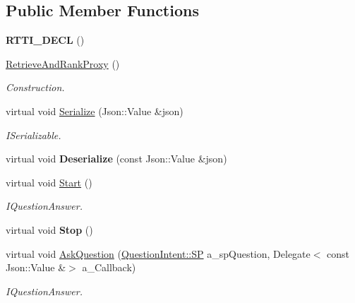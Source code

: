\subsection*{Public Member Functions}
\begin{DoxyCompactItemize}
\item 
\mbox{\label{class_retrieve_and_rank_proxy_a3c6e8d100b9f93ddfe543be4f9f2772f}} 
{\bfseries R\+T\+T\+I\+\_\+\+D\+E\+CL} ()
\item 
\mbox{\label{class_retrieve_and_rank_proxy_afcf015e04a0e2d4aba8ea0961e1d1609}} 
\hyperlink{class_retrieve_and_rank_proxy_afcf015e04a0e2d4aba8ea0961e1d1609}{Retrieve\+And\+Rank\+Proxy} ()
\begin{DoxyCompactList}\small\item\em Construction. \end{DoxyCompactList}\item 
\mbox{\label{class_retrieve_and_rank_proxy_ad6f13040c5fb81646667bc38d3d300a4}} 
virtual void \hyperlink{class_retrieve_and_rank_proxy_ad6f13040c5fb81646667bc38d3d300a4}{Serialize} (Json\+::\+Value \&json)
\begin{DoxyCompactList}\small\item\em I\+Serializable. \end{DoxyCompactList}\item 
\mbox{\label{class_retrieve_and_rank_proxy_a06c151d37ff30b6cc45df3b99fb449fb}} 
virtual void {\bfseries Deserialize} (const Json\+::\+Value \&json)
\item 
\mbox{\label{class_retrieve_and_rank_proxy_ab3575f2520ab94b298dc4875d468de24}} 
virtual void \hyperlink{class_retrieve_and_rank_proxy_ab3575f2520ab94b298dc4875d468de24}{Start} ()
\begin{DoxyCompactList}\small\item\em I\+Question\+Answer. \end{DoxyCompactList}\item 
\mbox{\label{class_retrieve_and_rank_proxy_ab2f63688623ccd8b424b677671f7f3bc}} 
virtual void {\bfseries Stop} ()
\item 
\mbox{\label{class_retrieve_and_rank_proxy_a8393f23b59a6b9f8f4763e3ad7ff74b3}} 
virtual void \hyperlink{class_retrieve_and_rank_proxy_a8393f23b59a6b9f8f4763e3ad7ff74b3}{Ask\+Question} (\hyperlink{class_question_intent_a250dceb08e1342574a0aca4fe40a7121}{Question\+Intent\+::\+SP} a\+\_\+sp\+Question, Delegate$<$ const Json\+::\+Value \&$>$ a\+\_\+\+Callback)
\begin{DoxyCompactList}\small\item\em I\+Question\+Answer. \end{DoxyCompactList}\end{DoxyCompactItemize}
